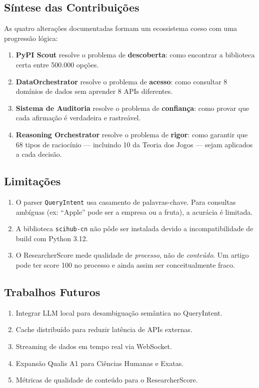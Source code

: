 \documentclass[12pt,a4paper]{article}
\begin{document}
\subsection{Síntese das Contribuições}

As quatro alterações documentadas formam um ecossistema coeso com uma progressão lógica:

\begin{enumerate}[itemsep=2pt]
  \item \textbf{PyPI Scout} resolve o problema de \textbf{descoberta}: como encontrar a biblioteca certa entre 500.000 opções.
  \item \textbf{DataOrchestrator} resolve o problema de \textbf{acesso}: como consultar 8 domínios de dados sem aprender 8 APIs diferentes.
  \item \textbf{Sistema de Auditoria} resolve o problema de \textbf{confiança}: como provar que cada afirmação é verdadeira e rastreável.
  \item \textbf{Reasoning Orchestrator} resolve o problema de \textbf{rigor}: como garantir que 68 tipos de raciocínio --- incluindo 10 da Teoria dos Jogos --- sejam aplicados a cada decisão.
\end{enumerate}

\subsection{Limitações}

\begin{enumerate}[itemsep=1pt]
  \item O parser \texttt{QueryIntent} usa casamento de palavras-chave. Para consultas ambíguas (ex: ``Apple'' pode ser a empresa ou a fruta), a acurácia é limitada.
  \item A biblioteca \texttt{scihub-cn} não pôde ser instalada devido a incompatibilidade de build com Python 3.12.
  \item O ResearcherScore mede qualidade de \textit{processo}, não de \textit{conteúdo}. Um artigo pode ter score 100 no processo e ainda assim ser conceitualmente fraco.
\end{enumerate}

\subsection{Trabalhos Futuros}

\begin{enumerate}[itemsep=1pt]
  \item Integrar LLM local para desambiguação semântica no QueryIntent.
  \item Cache distribuído para reduzir latência de APIs externas.
  \item Streaming de dados em tempo real via WebSocket.
  \item Expansão Qualis A1 para Ciências Humanas e Exatas.
  \item Métricas de qualidade de conteúdo para o ResearcherScore.
\end{enumerate}
\end{document}
